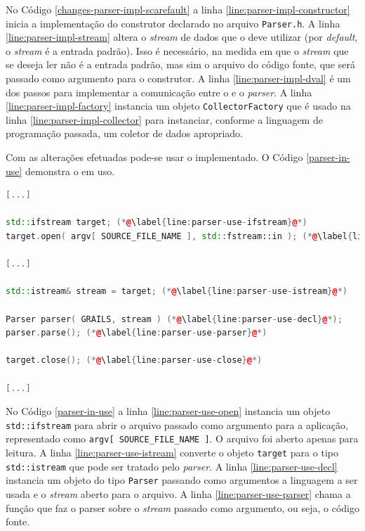No Código \ref{changes-parser-impl-scarefault} a linha \ref{line:parser-impl-constructor}
inicia a implementação do construtor declarado no arquivo \lstinline|Parser.h|.
A linha \ref{line:parser-impl-stream} altera o \textit{stream} de dados que
o \parser deve utilizar (por \textit{default}, o \textit{stream} é a entrada
padrão). Isso é necessário, na medida em que o \textit{stream} que se deseja
ler não é a entrada padrão, mas sim o arquivo do código fonte, que será
passado como argumento para o construtor. A linha
\ref{line:parser-impl-dval} é um dos passos para implementar a comunicação
entre o \scanner e o \textit{parser}. A linha \ref{line:parser-impl-factory}
instancia um objeto \lstinline|CollectorFactory| que é usado na linha
\ref{line:parser-impl-collector} para instanciar, conforme a linguagem de
programação passada, um coletor de dados apropriado.

Com as alterações efetuadas pode-se usar o \parser implementado. O Código
\ref{parser-in-use} demonstra o \parser em uso.

\begin{lstlisting}[language=C++, label=parser-in-use, caption=\textsf{Parser} em uso]
[...]

std::ifstream target; (*@\label{line:parser-use-ifstream}@*)
target.open( argv[ SOURCE_FILE_NAME ], std::fstream::in ); (*@\label{line:parser-use-open}@*)

[...]

std::istream& stream = target; (*@\label{line:parser-use-istream}@*)

Parser parser( GRAILS, stream ) (*@\label{line:parser-use-decl}@*);
parser.parse(); (*@\label{line:parser-use-parser}@*)

target.close(); (*@\label{line:parser-use-close}@*)

[...]
\end{lstlisting}

No Código \ref{parser-in-use} a linha \ref{line:parser-use-open} instancia um
objeto \lstinline|std::ifstream| para abrir o arquivo passado como argumento para
a aplicação, representado como \lstinline|argv[ SOURCE_FILE_NAME ]|. O arquivo foi
aberto apenas para leitura. A linha \ref{line:parser-use-istream} converte o
objeto \lstinline|target| para o tipo \lstinline|std::istream| que pode ser tratado
pelo \textit{parser}. A linha \ref{line:parser-use-decl} instancia um objeto do
tipo \lstinline|Parser| passando como argumentos a linguagem a ser usada e o
\textit{stream} aberto para o arquivo. A linha \ref{line:parser-use-parser} chama
a função que faz o {parser} sobre o \textit{stream} passado como argumento, ou seja,
o código fonte.

